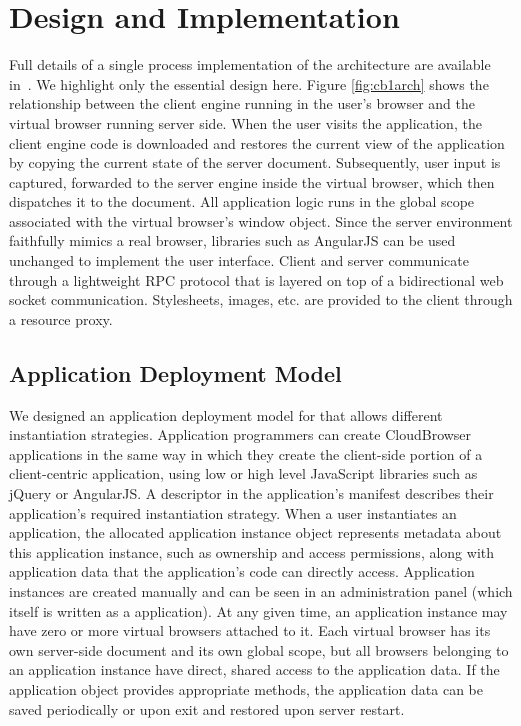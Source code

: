 \section{Design and Implementation}
\label{sec:implementation}

Full details of a single process implementation of the \cb architecture
are available in~\cite{mcdaniel2012cloudbrowser}.  We highlight only the
essential design here.  Figure \ref{fig:cb1arch} shows the relationship 
between the client engine running in the user's browser and the virtual browser
running server side.  When the user visits the application, the client engine
code is downloaded and restores the current view of the application by
copying the current state of the server document.  Subsequently, user input 
is captured, forwarded to the server engine inside the virtual browser, 
which then dispatches it to the document.  All application logic runs
in the global scope associated with the virtual browser's window object.
Since the server environment faithfully mimics a real browser, libraries
such as AngularJS can be used unchanged to implement the user interface.
Client and server communicate through a lightweight RPC protocol that is 
layered on top of a bidirectional web socket communication. 
Stylesheets, images, etc. are provided to the client through a resource
proxy.

\subsection{Application Deployment Model}

We designed an application deployment model for \cbtwo{} that allows different
instantiation strategies.
Application programmers can create CloudBrowser applications in the same way in which 
they create the client-side portion of a client-centric application, using low or high level
JavaScript libraries such as jQuery or AngularJS.  A descriptor in the application's
manifest describes their application's required instantiation strategy.
When a user instantiates an application, the allocated application instance object 
represents metadata about this application
instance, such as ownership and access permissions, along with application data that
the application's code can directly access.  Application instances are created manually
and can be seen in an administration panel (which itself is written as a \cb application).
At any given time, an application instance may have zero or more virtual browsers attached 
to it.  Each virtual browser has its own server-side document and its own global scope, 
but all browsers belonging to an application instance have direct, shared access to the 
application data.  If the application object provides appropriate methods, the application 
data can be saved periodically or upon exit and restored upon server restart.

